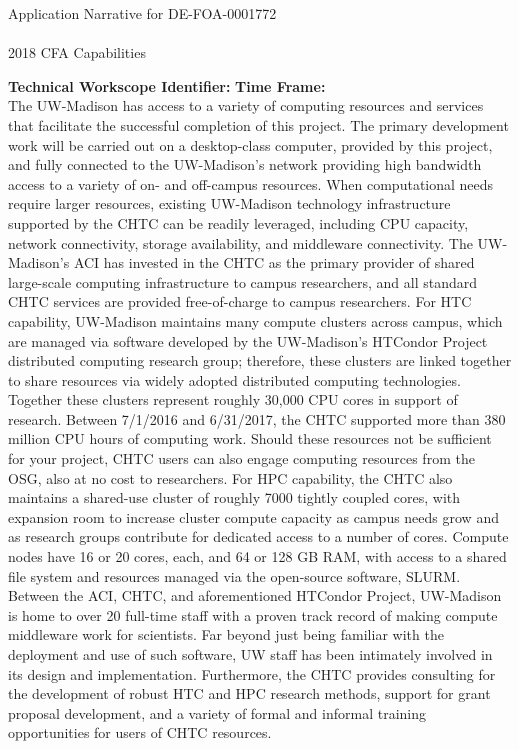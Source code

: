 \documentclass[dvips,12pt]{article}
\begin{document}
\begin{centering}
  Application Narrative for DE-FOA-0001772\\
  \textbf{\large \mytitle}\\
  2018 CFA Capabilities \ID\\
\end{centering}
\vspace{1em}

\noindent\textbf{Technical Workscope Identifier:} \workscope \hspace{0.5in}
\textbf{Time Frame:} \timeframe\\

The UW-Madison has access to a variety of computing resources and services
that facilitate the successful completion of this project.  The primary
development work will be carried out on a desktop-class computer, provided by
this project, and fully connected to the UW-Madison's network providing high
bandwidth access to a variety of on- and off-campus resources.  When
computational needs require larger resources, existing UW-Madison technology
infrastructure supported by the \gls{CHTC} can be readily leveraged, including
CPU capacity, network connectivity, storage availability, and middleware
connectivity. The UW-Madison's \gls{ACI} has invested in the \gls{CHTC} as the
primary provider of shared large-scale computing infrastructure to campus
researchers, and all standard \gls{CHTC} services are provided free-of-charge
to campus researchers. For \gls{HTC} capability,
UW-Madison maintains many compute clusters across campus, which are managed
via software developed by the UW-Madison's HTCondor Project distributed
computing research group; therefore, these clusters are linked together to
share resources via widely adopted distributed computing
technologies. Together these clusters represent roughly 30,000 CPU cores in
support of research. Between 7/1/2016 and 6/31/2017, the \gls{CHTC} supported
more than 380 million CPU hours of computing work. Should these resources not
be sufficient for your project, \gls{CHTC} users can also engage computing
resources from the \gls{OSG}, also at no cost to
researchers. For \gls{HPC} capability, the \gls{CHTC}
also maintains a shared-use cluster of roughly 7000 tightly coupled cores,
with expansion room to increase cluster compute capacity as campus needs grow
and as research groups contribute for dedicated access to a number of
cores. Compute nodes have 16 or 20 cores, each, and 64 or 128 GB RAM, with
access to a shared file system and resources managed via the open-source
software, SLURM.  Between the ACI, \gls{CHTC}, and aforementioned HTCondor
Project, UW-Madison is home to over 20 full-time staff with a proven track
record of making compute middleware work for scientists. Far beyond just being
familiar with the deployment and use of such software, UW staff has been
intimately involved in its design and implementation. Furthermore, the
\gls{CHTC} provides consulting for the development of robust HTC and HPC
research methods, support for grant proposal development, and a variety of
formal and informal training opportunities for users of \gls{CHTC} resources.




\label{LastPage}
\end{document}
